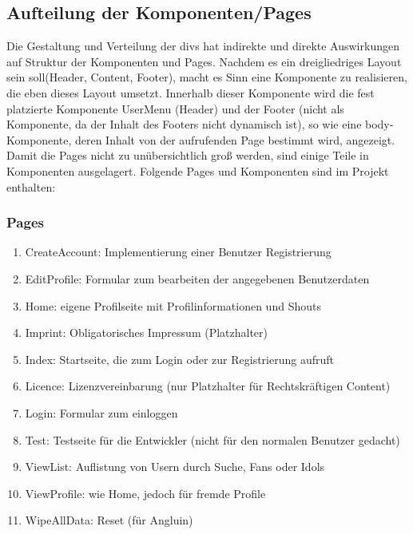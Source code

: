 \subsection*{Aufteilung der Komponenten/Pages}
Die Gestaltung und Verteilung der divs hat indirekte und direkte Auswirkungen auf Struktur der Komponenten und Pages. Nachdem es ein dreigliedriges Layout sein soll(Header, Content, Footer), macht es Sinn eine Komponente zu realisieren, die eben dieses Layout umsetzt. Innerhalb dieser Komponente wird die fest platzierte Komponente UserMenu (Header) und der Footer (nicht als Komponente, da der Inhalt des Footers nicht dynamisch ist), so wie eine body-Komponente, deren Inhalt von der aufrufenden Page bestimmt wird, angezeigt. Damit die Pages nicht zu unübersichtlich groß werden, sind einige Teile in Komponenten ausgelagert. Folgende Pages und Komponenten sind im Projekt enthalten:

\subsubsection*{Pages}
\begin{enumerate}
\item CreateAccount: Implementierung einer Benutzer Registrierung
\item EditProfile: Formular zum bearbeiten der angegebenen Benutzerdaten
\item Home: eigene Profilseite mit Profilinformationen und Shouts
\item Imprint: Obligatorisches Impressum (Platzhalter)
\item Index: Startseite, die zum Login oder zur Registrierung aufruft
\item Licence: Lizenzvereinbarung (nur Platzhalter für Rechtskräftigen Content) 
\item Login: Formular zum einloggen
\item Test: Testseite für die Entwickler (nicht für den normalen Benutzer gedacht)
\item ViewList: Auflistung von Usern durch Suche, Fans oder Idols
\item ViewProfile: wie Home, jedoch für fremde Profile
\item WipeAllData: Reset (für Angluin)
\end{enumerate}

